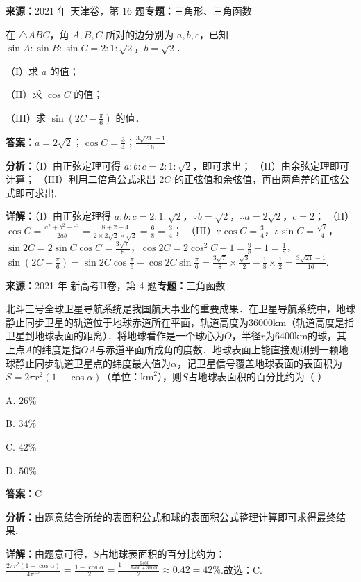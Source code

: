 \begin{question}[points=14]
\textbf{来源：}2021 年 天津卷，第 16 题\quad \textbf{专题：}三角形、三角函数\par
在 $\triangle ABC$，角 $A, B, C$ 所对的边分别为 $a, b, c$，已知 $\sin A : \sin B : \sin C = 2 : 1 : \sqrt{2}$，$b = \sqrt{2}$．

（I）求 $a$ 的值；

（II）求 $\cos C$ 的值；

（III）求 $\sin\left(2C - \frac{\pi}{6}\right)$ 的值．
\begin{solution}
\textbf{答案：}$a=2\sqrt{2}$；$\cos C = \frac{3}{4}$；$\frac{3\sqrt{21}-1}{16}$

\textbf{分析：}（I）由正弦定理可得 $a:b:c = 2:1:\sqrt{2}$，即可求出；
（II）由余弦定理即可计算；
（III）利用二倍角公式求出 $2C$ 的正弦值和余弦值，再由两角差的正弦公式即可求出.

\textbf{详解：}（I）由正弦定理得 $a:b:c = 2:1:\sqrt{2}$，$\because b = \sqrt{2}$，$\therefore a = 2\sqrt{2}$，$c=2$；
（II）$\cos C = \frac{a^2+b^2-c^2}{2ab} = \frac{8+2-4}{2\times 2\sqrt{2}\times \sqrt{2}} = \frac{6}{8} = \frac{3}{4}$；
（III）$\because \cos C = \frac{3}{4}$，$\therefore \sin C = \frac{\sqrt{7}}{4}$，$\sin 2C = 2\sin C \cos C = \frac{3\sqrt{7}}{8}$，$\cos 2C = 2\cos^2 C -1 = \frac{9}{8}-1 = \frac{1}{8}$，$\sin\left(2C - \frac{\pi}{6}\right) = \sin 2C \cos \frac{\pi}{6} - \cos 2C \sin \frac{\pi}{6} = \frac{3\sqrt{7}}{8} \times \frac{\sqrt{3}}{2} - \frac{1}{8} \times \frac{1}{2} = \frac{3\sqrt{21} - 1}{16}$.
\end{solution}
\end{question}

\begin{question}[points=5]
\textbf{来源：}2021 年 新高考II卷，第 4 题\quad \textbf{专题：}三角函数\par
北斗三号全球卫星导航系统是我国航天事业的重要成果．在卫星导航系统中，地球静止同步卫星的轨道位于地球赤道所在平面，轨道高度为$36000\text{km}$（轨道高度是指卫星到地球表面的距离）．将地球看作是一个球心为$O$，半径$r$为$6400\text{km}$的球，其上点$A$的纬度是指$OA$与赤道平面所成角的度数．地球表面上能直接观测到一颗地球静止同步轨道卫星点的纬度最大值为$\alpha$，记卫星信号覆盖地球表面的表面积为$S=2\pi r^2(1-\cos\alpha)$（单位：$\text{km}^2$），则$S$占地球表面积的百分比约为（ ）
\begin{choices}
  \item A. $26\%$
  \item B. $34\%$
  \item C. $42\%$
  \item D. $50\%$
\end{choices}
\begin{solution}
\textbf{答案：}C

\textbf{分析：}由题意结合所给的表面积公式和球的表面积公式整理计算即可求得最终结果.

\textbf{详解：}由题意可得，$S$占地球表面积的百分比约为：$\frac{2\pi r^2(1-\cos\alpha)}{4\pi r^2}=\frac{1-\cos\alpha}{2}=\frac{1-\frac{6400}{6400+36000}}{2}\approx0.42=42\%$.故选：C.
\end{solution}
\end{question}

